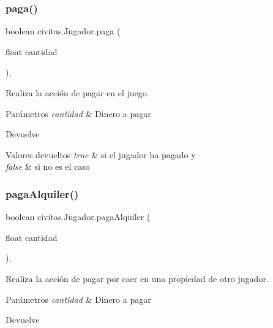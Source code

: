 \subsubsection{\texorpdfstring{paga()}{paga()}}
{\footnotesize\ttfamily boolean civitas.\+Jugador.\+paga (\begin{DoxyParamCaption}\item[{float}]{cantidad }\end{DoxyParamCaption})\hspace{0.3cm}{\ttfamily [inline]}, {\ttfamily [package]}}

Realiza la acción de pagar en el juego. 
\begin{DoxyParams}{Parámetros}
{\em cantidad} & Dinero a pagar \\
\hline
\end{DoxyParams}
\begin{DoxyReturn}{Devuelve}

\end{DoxyReturn}

\begin{DoxyRetVals}{Valores devueltos}
{\em true} & si el jugador ha pagado y \\
\hline
{\em false} & si no es el caso \\
\hline
\end{DoxyRetVals}
\mbox{\label{classcivitas_1_1Jugador_af63b04e25bc75ac3857bf0d6766cfc72}} 
\subsubsection{\texorpdfstring{paga\+Alquiler()}{pagaAlquiler()}}
{\footnotesize\ttfamily boolean civitas.\+Jugador.\+paga\+Alquiler (\begin{DoxyParamCaption}\item[{float}]{cantidad }\end{DoxyParamCaption})\hspace{0.3cm}{\ttfamily [inline]}, {\ttfamily [package]}}

Realiza la acción de pagar por caer en una propiedad de otro jugador. 
\begin{DoxyParams}{Parámetros}
{\em cantidad} & Dinero a pagar \\
\hline
\end{DoxyParams}
\begin{DoxyReturn}{Devuelve}

\end{DoxyReturn}

